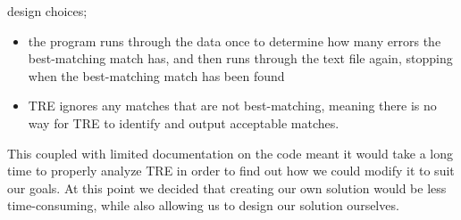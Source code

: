 design choices;
\begin{itemize}
\item the program runs through the data once to determine how many errors the 
best-matching match has, and then runs through the text file again, stopping 
when the best-matching match has been found 
\item TRE ignores any matches that are not best-matching, meaning there is 
no way for TRE to identify and output acceptable matches.
\end{itemize}
This coupled with limited documentation on the code meant it would 
take a long time to properly analyze TRE in order to find out how we could 
modify it to suit our goals. At this point we decided that creating our 
own solution would be less time-consuming, while also allowing us to design our 
solution ourselves.
